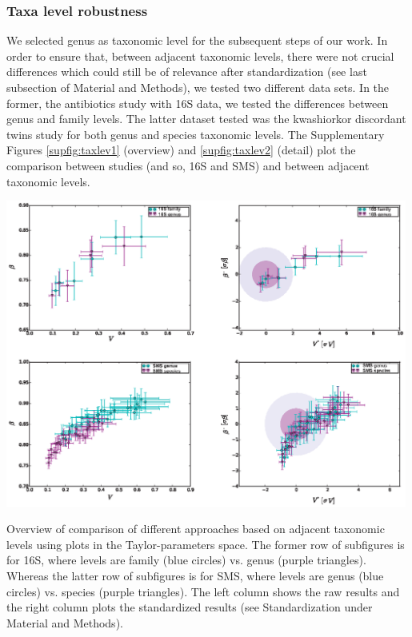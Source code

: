 \subsubsection*{Taxa level robustness}
We selected genus as taxonomic level for the subsequent steps of our work. In order to ensure that, between adjacent taxonomic levels, there were not crucial differences which could still be of relevance after standardization (see last subsection of Material and Methods), we tested two different data sets. In the former, the antibiotics study\cite{antibiotic} with 16S data, we tested the differences between genus and family levels. The latter dataset tested was the kwashiorkor discordant twins study\cite{kwashiorkor} for both genus and species taxonomic levels. The Supplementary Figures \ref{supfig:taxlev1} (overview) and \ref{supfig:taxlev2} (detail) plot the comparison between studies (and so, 16S and SMS) and between adjacent taxonomic levels.

\begin{supfig} 
  \includegraphics[width=0.99\textwidth]{figs/supfig_taxlev1.eps}
\caption{Overview of comparison of different approaches based on adjacent taxonomic levels using plots in the Taylor-parameters space. The former row of subfigures is for 16S, where levels are family (blue circles) vs. genus (purple triangles). Whereas the latter row of subfigures is for SMS, where levels are genus (blue circles) vs. species (purple triangles). The left column shows the raw results and the right column plots the standardized results (see Standardization under Material and Methods).}
\label{supfig:taxlev1}
\end{supfig}

